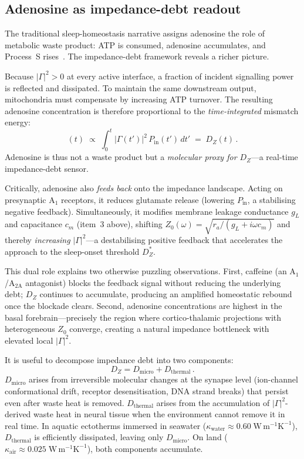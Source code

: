 ﻿\documentclass[aps,pre,twocolumn,superscriptaddress,floatfix]{revtex4-2}
\begin{document}
\subsection{Adenosine as impedance-debt readout}
\label{sec:adenosine}

The traditional sleep-homeostasis narrative assigns adenosine
the role of metabolic waste product: ATP is consumed,
adenosine accumulates, and Process~S rises~\cite{Porkka2011}.
The impedance-debt framework reveals a richer picture.

Because $|\Gamma|^2 > 0$ at every active interface, a fraction
of incident signalling power is reflected and dissipated.
To maintain the same downstream output, mitochondria must
compensate by increasing ATP turnover.
The resulting adenosine concentration is therefore
proportional to the \emph{time-integrated} mismatch energy:
\begin{equation}
  [\text{adenosine}](t)
  \;\propto\;
  \int_0^{t} |\Gamma(t')|^2\, P_{\mathrm{in}}(t')\,dt'
  \;=\; D_Z(t)\,.
  \label{eq:adenosine-DZ}
\end{equation}
Adenosine is thus not a waste product but a \emph{molecular
proxy for $D_Z$}---a real-time impedance-debt sensor.

Critically, adenosine also \emph{feeds back} onto the
impedance landscape.  Acting on presynaptic A$_1$ receptors,
it reduces glutamate release (lowering $P_{\mathrm{in}}$,
a stabilising negative feedback).  Simultaneously,
it modifies membrane leakage conductance $g_L$ and
capacitance $c_m$ (item~3 above), shifting
$Z_0(\omega) = \sqrt{r_a/(g_L + i\omega c_m)}$
and thereby \emph{increasing} $|\Gamma|^2$---a destabilising
positive feedback that accelerates the approach to the
sleep-onset threshold $D_Z^*$.

This dual role explains two otherwise puzzling observations.
First, caffeine (an A$_1$/A$_{2\mathrm{A}}$ antagonist)
blocks the feedback signal without reducing the underlying
debt; $D_Z$ continues to accumulate, producing an amplified
homeostatic rebound once the blockade clears.
Second, adenosine concentrations are highest in the basal
forebrain---precisely the region where cortico-thalamic
projections with heterogeneous $Z_0$ converge, creating
a natural impedance bottleneck with elevated local $|\Gamma|^2$.

It is useful to decompose impedance debt into two components:
\begin{equation}
  D_Z = D_{\mathrm{micro}} + D_{\mathrm{thermal}}\,.
  \label{eq:DZ-decomp}
\end{equation}
$D_{\mathrm{micro}}$ arises from irreversible molecular changes
at the synapse level (ion-channel conformational drift,
receptor desensitisation, DNA strand breaks) that persist
even after waste heat is removed.
$D_{\mathrm{thermal}}$ arises from the accumulation of
$|\Gamma|^2$-derived waste heat in neural tissue when the
environment cannot remove it in real time.
In aquatic ectotherms immersed in seawater
($\kappa_{\mathrm{water}} \approx 0.60\;\mathrm{W\,m^{-1}K^{-1}}$),
$D_{\mathrm{thermal}}$ is efficiently dissipated,
leaving only $D_{\mathrm{micro}}$.
On land ($\kappa_{\mathrm{air}} \approx 0.025\;\mathrm{W\,m^{-1}K^{-1}}$),
both components accumulate.
\end{document}
